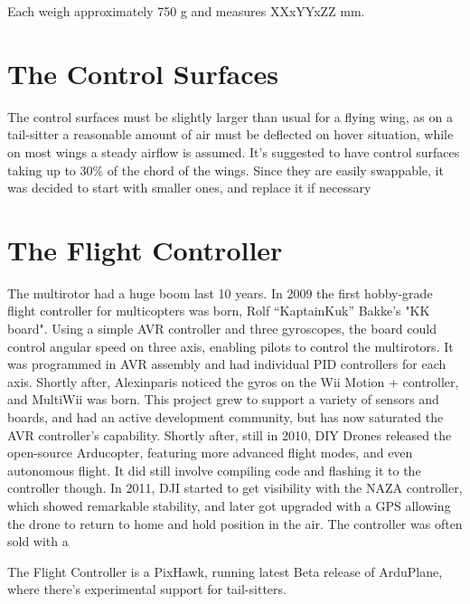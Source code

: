 Each weigh approximately 750 g and measures XXxYYxZZ mm.

\section{The Control Surfaces}

The control surfaces must be slightly larger than usual for a flying wing, as on a tail-sitter a reasonable amount of air must be deflected on hover situation, while on most wings a steady airflow is assumed. It's suggested to have control surfaces taking up to 30\% of the chord of the wings. Since they are easily swappable, it was decided to start with smaller ones, and replace it if necessary

\section{The Flight Controller}

The multirotor had a huge boom last 10 years. In 2009 the first hobby-grade flight controller for multicopters was born, Rolf “KaptainKuk” Bakke's "KK board". Using a simple AVR controller and three gyroscopes, the board could control angular speed on three axis, enabling pilots to control the multirotors. It was programmed in AVR assembly and had individual PID controllers for each axis.
%
Shortly after, Alexinparis noticed the gyros on the Wii Motion + controller, and MultiWii was born. This project grew to support a variety of sensors and boards, and had an active development community, but has now saturated the AVR controller's capability.
%
Shortly after, still in 2010, DIY Drones released the open-source Arducopter, featuring more advanced flight modes, and even autonomous flight.  It did still involve compiling code and flashing it to the controller though.
%
In 2011, DJI started to get visibility with the NAZA controller, which showed remarkable stability, and later got upgraded with a GPS allowing the drone to return to home and hold position in the air. The controller was often sold with a 





The Flight Controller is a PixHawk, running latest Beta release of ArduPlane, where there's experimental support for tail-sitters.


